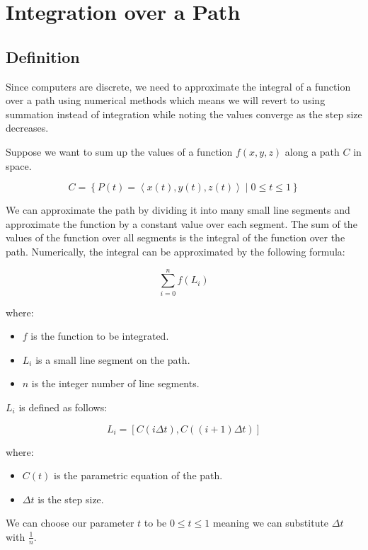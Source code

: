 \documentclass[12pt]{article}
\begin{document}
\newpage
\section{Integration over a Path}

\subsection{Definition}

Since computers are discrete, we need to approximate the integral of a function over a path using numerical methods which means we will revert to using summation instead of integration while noting the values converge as the step size decreases.

Suppose we want to sum up the values of a function \(f(x, y, z)\) along a path \(C\) in space.

\[
    C = \left\{P(t) = \left\langle x(t), y(t), z(t)\right\rangle \mid 0 \leq t \leq 1\right\}
\]

We can approximate the path by dividing it into many small line segments and approximate the function by a constant value over each segment.
The sum of the values of the function over all segments is the integral of the function over the path.
Numerically, the integral can be approximated by the following formula:

\[
    \sum_{i=0}^{n} f(L_i)
\]

where:

\begin{itemize}
    \item \(f\) is the function to be integrated.
    \item \(L_i\) is a small line segment on the path.
    \item \(n\) is the integer number of line segments.
\end{itemize}

\(L_i\) is defined as follows:

\[
    L_i = \left[C\left(i \Delta t\right), C\left((i + 1)\Delta t\right)\right]
\]

where:

\begin{itemize}
    \item \(C(t)\) is the parametric equation of the path.
    \item \(\Delta t\) is the step size.
\end{itemize}

We can choose our parameter \(t\) to be \(0 \leq t \leq 1\) meaning we can substitute \(\Delta t\) with
\(\frac{1}{n}\).
\end{document}
